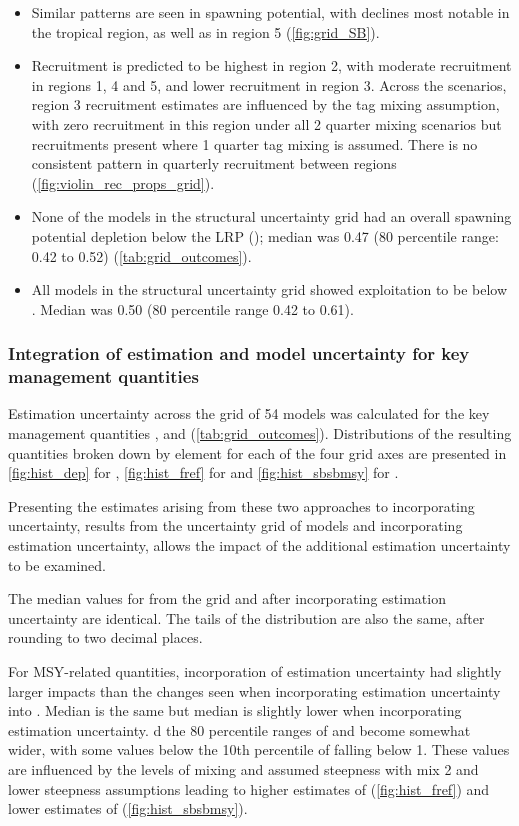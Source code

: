 \begin{itemize}
  \item Similar patterns are seen in spawning potential, with declines most notable in the tropical region, as well as in region 5 (\autoref{fig:grid_SB}).
  \item Recruitment is predicted to be highest in region 2, with moderate recruitment in regions 1, 4 and 5, and lower recruitment in region 3. Across the scenarios, region 3 recruitment estimates are influenced by the tag mixing assumption, with zero recruitment in this region under all 2 quarter mixing scenarios but recruitments present where 1 quarter tag mixing is assumed. There is no consistent pattern in quarterly recruitment between regions (\autoref{fig:violin_rec_props_grid}).
  \item None of the models in the structural uncertainty grid had an overall spawning potential depletion below the LRP (\lrp); median \sbrsbfo was 0.47 (80 percentile range: 0.42 to 0.52) (\autoref{tab:grid_outcomes}).
  \item All models in the structural uncertainty grid showed exploitation to be below \fmsy. Median \fref was 0.50 (80 percentile range 0.42 to 0.61).
\end{itemize}

\subsubsection{Integration of estimation and model uncertainty for key management quantities}
\label{sec:estimation_uncertainty_analysis}

Estimation uncertainty across the grid of 54 models was calculated for the key management quantities \sbrsbfo, \fref and \sbrsbmsy (\autoref{tab:grid_outcomes}). Distributions of the resulting quantities broken down by element for each of the four grid axes are presented in \autoref{fig:hist_dep} for \sbrsbfo, \autoref{fig:hist_fref} for \fref and \autoref{fig:hist_sbsbmsy} for \sbrsbmsy.

Presenting the estimates arising from these two approaches to incorporating uncertainty, results from the uncertainty grid of models and incorporating estimation uncertainty, allows the impact of the additional estimation uncertainty to be examined.

The median values for \sbrsbfo from the grid and after incorporating estimation uncertainty are identical. The tails of the distribution are also the same, after rounding to two decimal places.

For MSY-related quantities, incorporation of estimation uncertainty had slightly larger impacts than the changes seen when incorporating estimation uncertainty into \sbrsbfo. Median \fref is the same but median \sbrsbmsy is slightly lower when incorporating estimation uncertainty. d the 80 percentile ranges of \fref and \sbrsbmsy become somewhat wider, with some values below the 10th percentile of \sbrsbmsy falling below 1. These values are influenced by the levels of mixing and assumed steepness with mix 2 and lower steepness assumptions leading to higher estimates of \fref (\autoref{fig:hist_fref}) and lower estimates of \sbrsbmsy (\autoref{fig:hist_sbsbmsy}).

